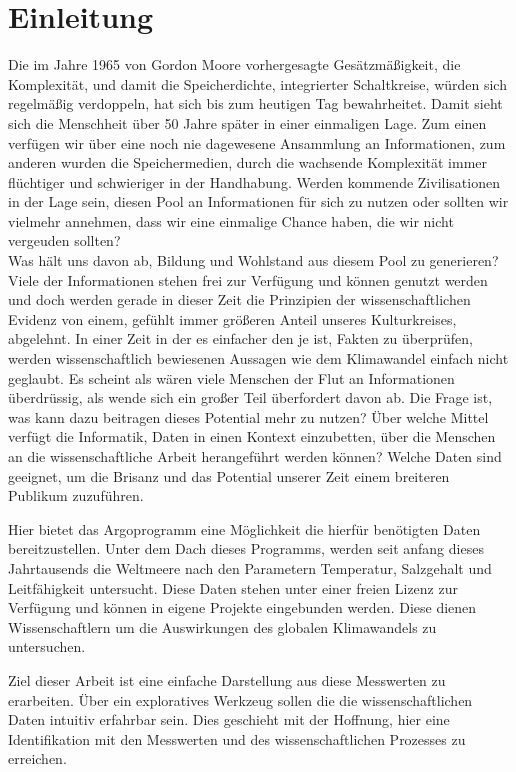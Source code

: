 
\section{Einleitung}

    
    Die im Jahre 1965 von Gordon Moore vorhergesagte Gesätzmäßigkeit, die Komplexität, und damit die Speicherdichte, integrierter Schaltkreise, würden sich regelmäßig verdoppeln,  hat sich bis zum heutigen Tag bewahrheitet. Damit sieht sich die Menschheit über 50 Jahre später in einer einmaligen Lage. 
    Zum einen verfügen wir über eine noch nie dagewesene Ansammlung an Informationen, zum anderen wurden die Speichermedien, durch die wachsende Komplexität immer flüchtiger und schwieriger in der Handhabung. Werden kommende Zivilisationen in der Lage sein, diesen Pool an Informationen für sich zu nutzen oder sollten wir vielmehr annehmen, dass wir eine einmalige Chance haben, die wir nicht vergeuden sollten? \\
    
    Was hält uns davon ab, Bildung und Wohlstand aus diesem Pool zu generieren? Viele der Informationen stehen frei zur Verfügung und können genutzt werden und doch werden gerade in dieser Zeit die Prinzipien der wissenschaftlichen Evidenz von einem, gefühlt immer größeren Anteil unseres Kulturkreises, abgelehnt. 
    In einer Zeit in der es einfacher den je ist, Fakten zu überprüfen, werden wissenschaftlich bewiesenen Aussagen wie dem Klimawandel einfach nicht geglaubt.
    Es scheint als wären viele Menschen der Flut an Informationen überdrüssig, als wende sich ein großer Teil überfordert davon ab.
    Die Frage ist, was kann dazu beitragen dieses Potential mehr zu nutzen? 
    Über welche Mittel verfügt die Informatik, Daten in einen Kontext einzubetten, über die Menschen an  die wissenschaftliche Arbeit herangeführt werden können? Welche Daten sind geeignet, um die Brisanz und das Potential unserer Zeit einem breiteren Publikum zuzuführen.
    
    Hier bietet das Argoprogramm eine Möglichkeit die hierfür benötigten Daten bereitzustellen. Unter dem Dach dieses Programms, werden seit anfang dieses Jahrtausends die Weltmeere nach den Parametern Temperatur, Salzgehalt und Leitfähigkeit untersucht. Diese Daten stehen unter einer freien Lizenz zur Verfügung und können in eigene Projekte eingebunden werden.  Diese dienen Wissenschaftlern um die Auswirkungen des globalen Klimawandels zu untersuchen.
   
    Ziel dieser Arbeit ist eine einfache Darstellung aus diese Messwerten zu erarbeiten. Über ein exploratives Werkzeug sollen die  die wissenschaftlichen Daten intuitiv erfahrbar sein. Dies geschieht mit der Hoffnung, hier eine Identifikation mit den Messwerten und des wissenschaftlichen Prozesses zu erreichen. 
   
